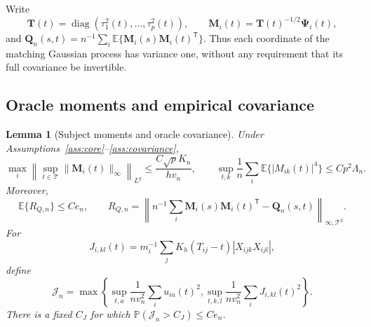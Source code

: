 \documentclass[12pt]{article}
\newtheorem{lemma}{Lemma}
\newcommand{\bM}{{\mathbf M}}
\newcommand{\bQ}{{\mathbf Q}}
\newcommand{\bT}{{\mathbf T}}
\newcommand{\bPsi} {\boldsymbol{\Psi}}
\newcommand{\expect}{\mathbb{E}}
\newcommand{\prob}{\mathbb{P}}
\newcommand{\trans}{{\scriptscriptstyle\mathsf{T}}}
\numberwithin{equation}{section}
\begin{document}
Write
\[
\bT(t)=\operatorname{diag}(\tau_1^2(t),\ldots,\tau_p^2(t)),\qquad
\bM_i(t)=\bT(t)^{-1/2}\bPsi_i(t),
\]
and $\bQ_n(s,t)=n^{-1}\sum_i\expect\{\bM_i(s)\bM_i(t)^\trans\}$.
Thus each coordinate of the matching Gaussian process has variance
one, without any requirement that its full covariance be invertible.

\subsection{Oracle moments and empirical covariance}

\begin{lemma}[Subject moments and oracle covariance]
\label{lem:hd-oracle-covariance}
Under Assumptions~\ref{ass:core}--\ref{ass:covariance},
\[
\max_i\left\|\sup_{t\in\mathcal T}\|\bM_i(t)\|_\infty
\right\|_{L^q}\le\frac{C\sqrt p K_n}{hv_n},\qquad
\sup_{t,k}\frac1n\sum_i\expect\{|M_{ik}(t)|^4\}
\le Cp^2\Lambda_n.
\]
Moreover,
\[
\expect\{R_{Q,n}\}\le Ce_n,\qquad
R_{Q,n}=\left\|n^{-1}\sum_i\bM_i(s)\bM_i(t)^\trans
-\bQ_n(s,t)\right\|_{\infty,\mathcal T^2}.
\]
For
\[
J_{i,kl}(t)=m_i^{-1}\sum_jK_h(T_{ij}-t)|X_{ijk}X_{ijl}|,
\]
define
\[
\mathcal J_n=\max\left\{
\sup_{t,a}\frac1{nv_n^2}\sum_i u_{ia}(t)^2,
\sup_{t,k,l}\frac1{nv_n^2}\sum_iJ_{i,kl}(t)^2\right\}.
\]
There is a fixed $C_J$ for which
$\prob(\mathcal J_n>C_J)\le Ce_n$.
\end{lemma}
\end{document}
